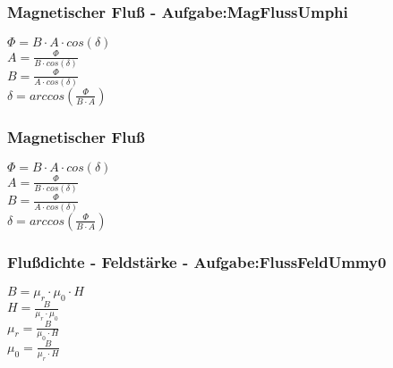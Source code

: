 \subsubsection{Magnetischer Fluß - Aufgabe:MagFlussUmphi} 
\begin{minipage}{0.45\textwidth} 
$ \Phi  = B\cdot A\cdot cos(\delta ) $\\ 
$ A = \frac{ \Phi }{B\cdot cos(\delta )} $\\ 
$ B = \frac{ \Phi }{A\cdot cos(\delta )} $\\ 
$ \delta =arccos(\frac{ \Phi }{B\cdot A}) $\\ 
\end{minipage} 
\begin{minipage}{0.45\textwidth} 
 
\end{minipage} 
\subsubsection{Magnetischer Fluß} 
\begin{minipage}{0.45\textwidth} 
$ \Phi  = B\cdot A\cdot cos(\delta ) $\\ 
$ A = \frac{ \Phi }{B\cdot cos(\delta )} $\\ 
$ B = \frac{ \Phi }{A\cdot cos(\delta )} $\\ 
$ \delta =arccos(\frac{ \Phi }{B\cdot A}) $\\ 
\end{minipage} 
\begin{minipage}{0.45\textwidth} 
 
\end{minipage} 
\subsubsection{Flußdichte - Feldstärke - Aufgabe:FlussFeldUmmy0} 
\begin{minipage}{0.45\textwidth} 
$ B = \mu _{r} \cdot \mu _{0} \cdot H $\\ 
$ H =\frac{ B}{\mu _{r} \cdot \mu _{0} } $\\ 
$ \mu _{r} =\frac{ B}{\mu _{0} \cdot H} $\\ 
$ \mu _{0} =\frac{ B}{\mu _{r} \cdot H} $\\ 
\end{minipage} 
\begin{minipage}{0.45\textwidth} 
 
\end{minipage} 
